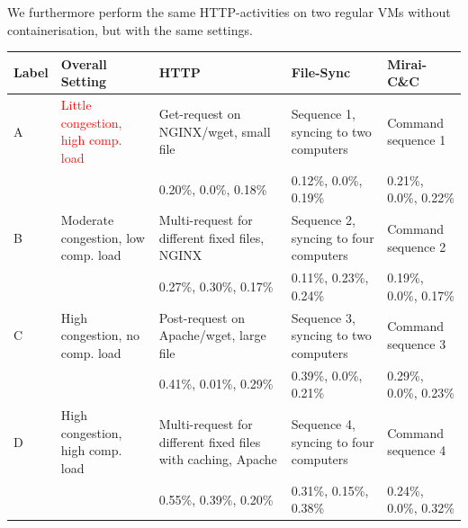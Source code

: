 \documentclass{article}
\begin{document}
We furthermore perform the same HTTP-activities on two regular VMs without containerisation, but with the same settings.


\begin{table}
\centering
\begin{tabular}{p{0.8cm}|p{2.5cm}|p{2.7cm}|p{2.7cm}|p{2.7cm}}
Label &Overall Setting&HTTP&File-Sync & Mirai-C\&C\\ \hline
A&\textcolor{red}{Little congestion, high comp. load} & Get-request on NGINX/wget, small file & Sequence 1,  syncing to two computers & Command sequence 1 \\ \hline
 &&\footnotesize \textcolor{myred}{0.20\%}, \textcolor{mygreen}{0.0\%}, \textcolor{myblue}{0.18\%}&
 \footnotesize \textcolor{myred}{0.12\%}, \textcolor{mygreen}{0.0\%}, \textcolor{myblue}{0.19\%}&
 \footnotesize \textcolor{myred}{0.21\%}, \textcolor{mygreen}{0.0\%}, \textcolor{myblue}{0.22\%}\\ \hline \hline
B& Moderate congestion, low comp. load &Multi-request for different fixed files, NGINX & Sequence 2,  syncing to four computers & Command sequence 2\\ \hline
 &&\footnotesize \textcolor{myred}{0.27\%}, \textcolor{mygreen}{0.30\%}, \textcolor{myblue}{0.17\%}&
\footnotesize \textcolor{myred}{0.11\%}, \textcolor{mygreen}{0.23\%}, \textcolor{myblue}{0.24\%}&
\footnotesize \textcolor{myred}{0.19\%}, \textcolor{mygreen}{0.0\%}, \textcolor{myblue}{0.17\%}\\ \hline \hline
C& High congestion, no comp. load & Post-request on Apache/wget, large file &Sequence 3,  syncing to two computers & Command sequence 3\\ \hline
 &&\footnotesize \textcolor{myred}{0.41\%}, \textcolor{mygreen}{0.01\%}, \textcolor{myblue}{0.29\%}&
 \footnotesize \textcolor{myred}{0.39\%}, \textcolor{mygreen}{0.0\%}, \textcolor{myblue}{0.21\%}&
 \footnotesize \textcolor{myred}{0.29\%}, \textcolor{mygreen}{0.0\%}, \textcolor{myblue}{0.23\%}\\ \hline \hline
D& High congestion, high comp. load & Multi-request for different fixed files with caching, Apache & Sequence 4,  syncing to four computers & Command sequence 4\\ \hline
 &&\footnotesize \textcolor{myred}{0.55\%}, \textcolor{mygreen}{0.39\%}, \textcolor{myblue}{0.20\%}&
 \footnotesize \textcolor{myred}{0.31\%}, \textcolor{mygreen}{0.15\%}, \textcolor{myblue}{0.38\%}&
 \footnotesize \textcolor{myred}{0.24\%}, \textcolor{mygreen}{0.0\%}, \textcolor{myblue}{0.32\%}\\ \hline \hline

\end{tabular}
\end{table}
\end{document}
